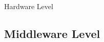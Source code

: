 \documentclass[compress,11pt,xcolor=svgnames,aspectratio=169]{beamer}
\newcommand{\lr}[1]{\textcolor{cyan}{LR: #1}}
\begin{document}
\begin{frame}[fragile]{Hardware Level}
\begin{itemize}

\end{itemize}

\nocite{3372390}

\end{frame}

\subsection{Middleware Level}
\end{document}
